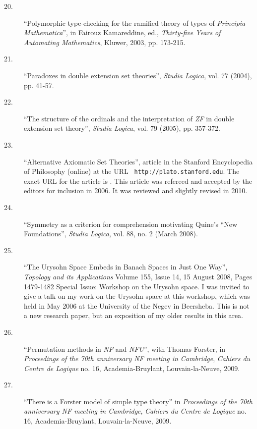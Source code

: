 \begin{description}
\begin{description}
\item[20.]  ``Polymorphic type-checking for the ramified theory of
types of {\em Principia Mathematica\/}'', in Fairouz Kamareddine, ed.,
{\em Thirty-five Years of Automating Mathematics\/}, Kluwer, 2003,
pp. 173-215.

\item[21.]  ``Paradoxes in double extension set theories'', {\em Studia Logica\/}, vol. 77 (2004), pp. 41-57.

\item[22.]  ``The structure of the ordinals and the interpretation of
{\em ZF\/} in double extension set theory'', {\em Studia
Logica\/}, vol. 79 (2005), pp. 357-372.

\item[23.] ``Alternative Axiomatic Set Theories'', article in the
Stanford Encyclopedia of Philosophy (online) at the URL {\tt
http://plato.stanford.edu}.  The exact URL for the article is .  This
article was refereed and accepted by the editors for inclusion in
2006.  It was reviewed and slightly revised in 2010.

\item[24.] ``Symmetry as a criterion for comprehension motivating
Quine's ``New Foundations'', {\em Studia Logica\/}, vol. 88, no. 2
(March 2008).

\item[25.] ``The Urysohn Space Embeds in Banach Spaces in Just One
Way'', {\em Topology and its Applications\/} Volume 155, Issue 14, 15
August 2008, Pages 1479-1482 Special Issue: Workshop on the Urysohn
space.  I was invited to give a talk on my work on the Urysohn space
at this workshop, which was held in May 2006 at the University of the
Negev in Beersheba.  This is not a new research paper, but an
exposition of my older results in this area.

\item[26.] ``Permutation methods in {\em NF\/} and {\em NFU\/}'', with
Thomas Forster, in {\em Proceedings of the 70th anniversary NF meeting
in Cambridge\/}, {\em Cahiers du Centre de Logique\/} no. 16,
Academia-Bruylant, Louvain-la-Neuve, 2009.

\item[27.] ``There is a Forster model of simple type theory'' in {\em
Proceedings of the 70th anniversary NF meeting in Cambridge\/}, {\em
Cahiers du Centre de Logique\/} no. 16, Academia-Bruylant,
Louvain-la-Neuve, 2009.


\end{description}
\end{description}
